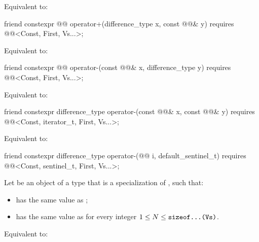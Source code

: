 \begin{itemdescr}
\pnum
\effects
Equivalent to: 
\end{itemdescr}

\begin{itemdecl}
friend constexpr @@ operator+(difference_type x, const @@& y)
  requires @@<Const, First, Vs...>;
\end{itemdecl}

\begin{itemdescr}
\pnum
\effects
Equivalent to: 
\end{itemdescr}

\begin{itemdecl}
friend constexpr @@ operator-(const @@& x, difference_type y)
  requires @@<Const, First, Vs...>;
\end{itemdecl}

\begin{itemdescr}
\pnum
\effects
Equivalent to: 
\end{itemdescr}

\begin{itemdecl}
friend constexpr difference_type operator-(const @@& x, const @@& y)
  requires @@<Const, iterator_t, First, Vs...>;
\end{itemdecl}

\begin{itemdescr}
\pnum
\effects
Equivalent to: 
\end{itemdescr}

\begin{itemdecl}
friend constexpr difference_type operator-(@@ i, default_sentinel_t)
  requires @@<Const, sentinel_t, First, Vs...>;
\end{itemdecl}

\begin{itemdescr}
\pnum
Let  be an object of a type
that is a specialization of , such that:
\begin{itemize}
\item
{} has the same value as
;
\item
{} has the same value as
for every integer $1 \le N \le \texttt{sizeof...(Vs)}$.
\end{itemize}

\pnum
\effects
Equivalent to: 
\end{itemdescr}

